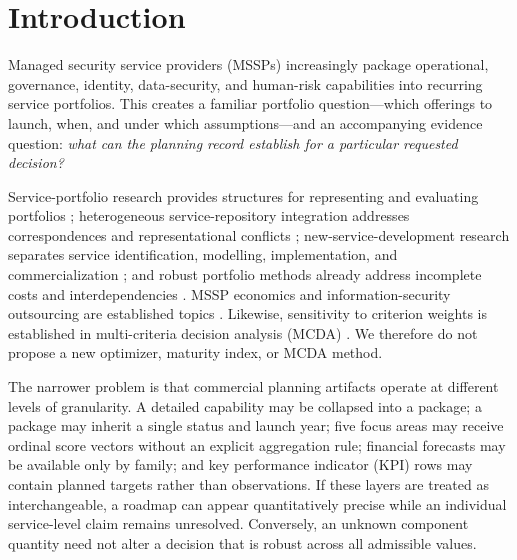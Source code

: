 \documentclass[systems,article,submit,moreauthors]{Definitions/mdpi}
\begin{document}

\section{Introduction}
Managed security service providers (MSSPs) increasingly package operational, governance, identity, data-security, and human-risk capabilities into recurring service portfolios. This creates a familiar portfolio question---which offerings to launch, when, and under which assumptions---and an accompanying evidence question: \emph{what can the planning record establish for a particular requested decision?}

Service-portfolio research provides structures for representing and evaluating portfolios \cite{Kohlborn2009,Comerio2015}; heterogeneous service-repository integration addresses correspondences and representational conflicts \cite{BatiniComerio2016}; new-service-development research separates service identification, modelling, implementation, and commercialization \cite{LinHsieh2011,MenorRoth2008}; and robust portfolio methods already address incomplete costs and interdependencies \cite{Liesio2008,Tavana2019}. MSSP economics and information-security outsourcing are established topics \cite{GuptaZhdanov2012,Wu2017}. Likewise, sensitivity to criterion weights is established in multi-criteria decision analysis (MCDA) \cite{Maliene2018}. We therefore do not propose a new optimizer, maturity index, or MCDA method.

The narrower problem is that commercial planning artifacts operate at different levels of granularity. A detailed capability may be collapsed into a package; a package may inherit a single status and launch year; five focus areas may receive ordinal score vectors without an explicit aggregation rule; financial forecasts may be available only by family; and key performance indicator (KPI) rows may contain planned targets rather than observations. If these layers are treated as interchangeable, a roadmap can appear quantitatively precise while an individual service-level claim remains unresolved. Conversely, an unknown component quantity need not alter a decision that is robust across all admissible values.
\end{document}
